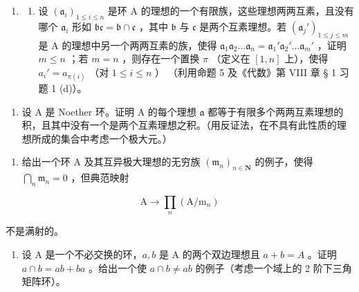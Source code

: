 \begin{enumerate}
\def\labelenumi{\arabic{enumi}.}
\setcounter{enumi}{8}
\tightlist
\item
  \begin{enumerate}
  \def\labelenumii{(\alph{enumii})}
  \tightlist
  \item
    设 \((\mathfrak{a}_i)_{1 \leqslant i \leqslant n}\) 是环 A 的理想的一个有限族，这些理想两两互素，且没有哪个 \(\mathfrak{a}_i\) 形如 \(\mathfrak{bc} = \mathfrak{b} \cap \mathfrak{c}\) ，其中 \(\mathfrak{b}\) 与 \(\mathfrak{c}\) 是两个互素理想。若 \((\mathfrak{a}_j')_{1 \leqslant j \leqslant m}\) 是 A 的理想中另一个两两互素的族，使得 \(\mathfrak{a}_1\mathfrak{a}_2 \ldots \mathfrak{a}_n = \mathfrak{a}_1'\mathfrak{a}_2' \ldots \mathfrak{a}_m'\) ，证明 \(m \leqslant n\) ；若 \(m = n\) ，则存在一个置换 \(\pi\) （定义在 \([1, n]\) 上），使得 \(a_i' = a_{\pi(i)}\) （对 \(1 \leqslant i \leqslant n\) ） （利用命题 5 及《代数》第 VIII 章 § 1 习题 1 (d)）。
  \end{enumerate}
\end{enumerate}

\begin{enumerate}
\def\labelenumi{(\alph{enumi})}
\setcounter{enumi}{1}
\tightlist
\item
  设 A 是 Noether 环。证明 A 的每个理想 \(\mathfrak{a}\) 都等于有限多个两两互素理想的积，且其中没有一个是两个互素理想之积。（用反证法，在不具有此性质的理想所成的集合中考虑一个极大元。）
\end{enumerate}

\begin{enumerate}
\def\labelenumi{\arabic{enumi}.}
\setcounter{enumi}{9}
\tightlist
\item
  给出一个环 A 及其互异极大理想的无穷族 \((\mathfrak{m}_n)_{n\in \mathbf{N}}\) 的例子，使得 \(\bigcap_{n}\mathfrak{m}_{n} = 0\) ，但典范映射
\end{enumerate}

\[
\mathrm{A} \rightarrow \prod_ {n} (\mathrm{A} / \mathrm{m} _ {n})
\]

不是满射的。

\begin{enumerate}
\def\labelenumi{\arabic{enumi}.}
\setcounter{enumi}{10}
\tightlist
\item
  设 A 是一个不必交换的环，\(a, b\) 是 A 的两个双边理想且 \(a + b = A\) 。证明 \(a \cap b = ab + ba\) 。给出一个使 \(a \cap b \neq ab\) 的例子（考虑一个域上的 2 阶下三角矩阵环）。
\end{enumerate}

